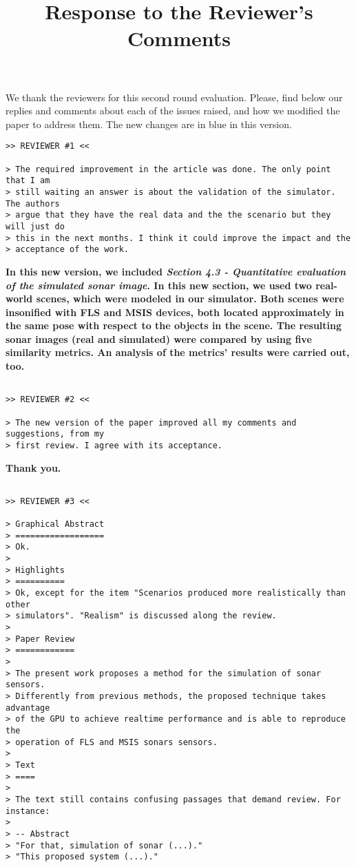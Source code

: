 \documentclass{article}
\title{Response to the Reviewer's Comments}
\begin{document}
\maketitle

We thank the reviewers for this second round evaluation. Please, find below our replies and comments about each of the issues raised, and how we modified the paper to address them. The new changes are in blue in this version.

\begin{verbatim}
>> REVIEWER #1 <<

> The required improvement in the article was done. The only point that I am
> still waiting an answer is about the validation of the simulator. The authors
> argue that they have the real data and the the scenario but they will just do
> this in the next months. I think it could improve the impact and the
> acceptance of the work.

\end{verbatim}

\textbf{In this new version, we included \textit{Section 4.3 - Quantitative evaluation of the simulated sonar image}. In this new section, we used two real-world scenes, which were modeled in our simulator. Both scenes were insonified with FLS and MSIS devices, both located approximately in the same pose with respect to the objects in the scene. The resulting sonar images (real and simulated) were compared by using five similarity metrics. An analysis of the metrics' results were carried out, too.}

\begin{verbatim}

>> REVIEWER #2 <<

> The new version of the paper improved all my comments and suggestions, from my
> first review. I agree with its acceptance.

\end{verbatim}

\textbf{Thank you.}

\begin{verbatim}

>> REVIEWER #3 <<

> Graphical Abstract
> ==================
> Ok.
>
> Highlights
> ==========
> Ok, except for the item "Scenarios produced more realistically than other
> simulators". "Realism" is discussed along the review.
>
> Paper Review
> ============
>
> The present work proposes a method for the simulation of sonar sensors.
> Differently from previous methods, the proposed technique takes advantage
> of the GPU to achieve realtime performance and is able to reproduce the
> operation of FLS and MSIS sonars sensors.
>
> Text
> ====
>
> The text still contains confusing passages that demand review. For instance:
>
> -- Abstract
> "For that, simulation of sonar (...)."
> "This proposed system (...)."
\end{verbatim}
\end{document}
